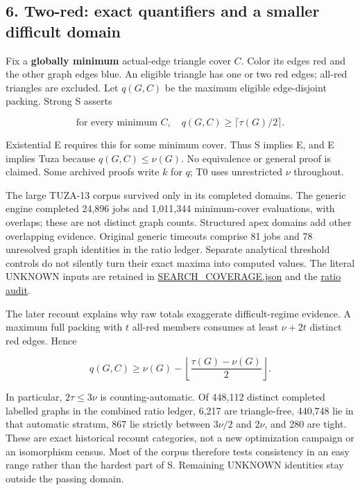\documentclass[11pt,a4paper]{article}
\begin{document}
\subsection{6. Two-red: exact quantifiers and a smaller difficult domain}\label{two-red-exact-quantifiers-and-a-smaller-difficult-domain}

Fix a \textbf{globally minimum} actual-edge triangle cover \(C\). Color its edges red and the other graph edges blue. An eligible triangle has one or two red edges; all-red triangles are excluded. Let \(q(G,C)\) be the maximum eligible edge-disjoint packing. Strong S asserts

\[\text{for every minimum }C,\quad q(G,C)\ge\lceil\tau(G)/2\rceil.\]

Existential E requires this for some minimum cover. Thus S implies E, and E implies Tuza because \(q(G,C)\le\nu(G)\). No equivalence or general proof is claimed. Some archived proofs write \(k\) for \(q\); T0 uses unrestricted \(\nu\) throughout.

The large TUZA-13 corpus survived only in its completed domains. The generic engine completed 24,896 jobs and 1,011,344 minimum-cover evaluations, with overlaps; these are not distinct graph counts. Structured apex domains add other overlapping evidence. Original generic timeouts comprise 81 jobs and 78 unresolved graph identities in the ratio ledger. Separate analytical threshold controls do not silently turn their exact maxima into computed values. The literal UNKNOWN inputs are retained in \href{https://github.com/pappa211/ai-math-experiments/blob/main/problems/TUZA-13/SEARCH_COVERAGE.json}{SEARCH\_COVERAGE.json} and the \href{https://github.com/pappa211/ai-math-experiments/blob/main/problems/TUZA-14B/RATIO_AUDIT.md}{ratio audit}.

The later recount explains why raw totals exaggerate difficult-regime evidence. A maximum full packing with \(t\) all-red members consumes at least \(\nu+2t\) distinct red edges. Hence

\[q(G,C)\ge\nu(G)-\left\lfloor\frac{\tau(G)-\nu(G)}2\right\rfloor.\]

In particular, \(2\tau\le3\nu\) is counting-automatic. Of 448,112 distinct completed labelled graphs in the combined ratio ledger, 6,217 are triangle-free, 440,748 lie in that automatic stratum, 867 lie strictly between \(3\nu/2\) and \(2\nu\), and 280 are tight. These are exact historical recount categories, not a new optimization campaign or an isomorphism census. Most of the corpus therefore tests consistency in an easy range rather than the hardest part of S. Remaining UNKNOWN identities stay outside the passing domain.
\end{document}
